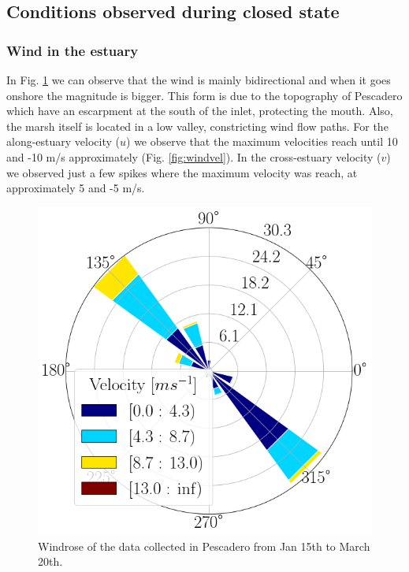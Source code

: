 \documentclass[11pt,letterpaper]{article}
\begin{document}
\subsection{Conditions observed during closed state}

\subsubsection{Wind in the estuary}

In Fig. \ref{fig:windrose} we can observe that the wind is mainly bidirectional and when it goes onshore the magnitude is bigger. This form is due to the topography of Pescadero which have an escarpment at the south of the inlet, protecting the mouth. Also, the marsh itself is located in a low valley, constricting wind flow paths. For the along-estuary velocity ($u$) we observe that the maximum velocities reach until 10 and -10 m/s approximately (Fig. \ref{fig:windvel}). In the cross-estuary velocity ($v$) we observed just a few spikes where the maximum velocity was reach, at approximately 5 and -5 m/s.   

\begin{figure}[h!]
    \centering
    \includegraphics[scale=0.3]{Imagenes/windrose.png}
    \caption{Windrose of the data collected in Pescadero from Jan 15th to March 20th.}
    \label{fig:windrose}
\end{figure}
\end{document}
